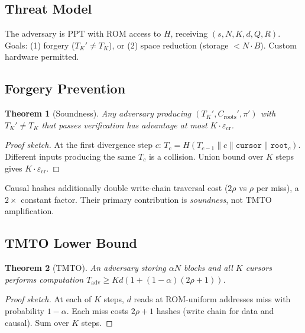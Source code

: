 \documentclass[conference,twocolumn]{IEEEtran}
\newtheorem{theorem}{Theorem}
\begin{document}
\subsection{Threat Model}

The adversary is PPT with ROM access to $H$, receiving $(s, N, K,
d, Q, R)$. Goals: (1) forgery ($T_K' \neq T_K$), or (2) space
reduction (storage $< N \cdot B$). Custom hardware permitted.

\subsection{Forgery Prevention}

\begin{theorem}[Soundness]
Any adversary producing $(T_K', C_{\text{roots}}', \pi')$ with
$T_K' \neq T_K$ that passes verification has advantage at most
$K \cdot \varepsilon_{\text{cr}}$.
\end{theorem}

\begin{proof}[Proof sketch]
At the first divergence step $c$:
$T_c = H(T_{c-1} \| c \| \texttt{cursor} \| \texttt{root}_c)$.
Different inputs producing the same $T_c$ is a collision. Union
bound over $K$ steps gives $K \cdot \varepsilon_{\text{cr}}$.
\end{proof}

Causal hashes additionally double write-chain traversal cost
($2\rho$ vs $\rho$ per miss), a $2{\times}$ constant factor.
Their primary contribution is \emph{soundness}, not TMTO
amplification.

\subsection{TMTO Lower Bound}\label{sec:tmto}

\begin{theorem}[TMTO]
An adversary storing $\alpha N$ blocks and all $K$ cursors
performs computation
$T_{\text{adv}} \geq K d (1 + (1{-}\alpha)(2\rho{+}1))$.
\end{theorem}

\begin{proof}[Proof sketch]
At each of $K$ steps, $d$ reads at ROM-uniform addresses miss
with probability $1{-}\alpha$. Each miss costs $2\rho{+}1$
hashes (write chain for data and causal). Sum over $K$ steps.
\end{proof}
\end{document}
